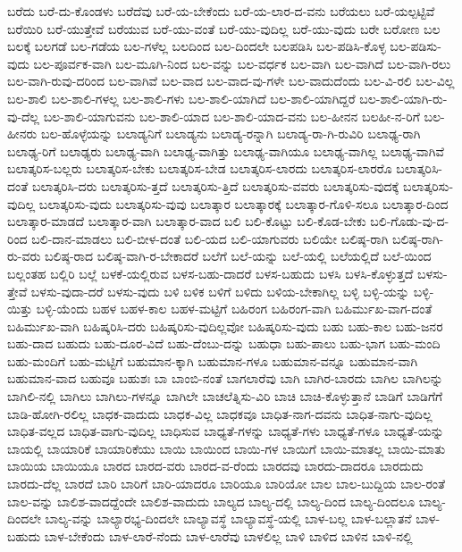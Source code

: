 {ಬರೆದು
ಬರೆ-ದು-ಕೊಂಡಳು
ಬರೆದೆವು
ಬರೆ-ಯ-ಬೇಕೆಂದು
ಬರೆ-ಯ-ಲಾರ-ದ-ವನು
ಬರೆಯಲು
ಬರೆ-ಯಲ್ಪಟ್ಟಿವೆ
ಬರೆಯಿರಿ
ಬರೆ-ಯುತ್ತೇವೆ
ಬರೆಯುವ
ಬರೆ-ಯು-ವಂತೆ
ಬರೆ-ಯು-ವುದಿಲ್ಲ
ಬರೆ-ಯು-ವುದು
ಬರೇ
ಬರೋಣ
ಬಲ
ಬಲಕ್ಕೆ
ಬಲಗಡೆ
ಬಲ-ಗಡೆಯ
ಬಲ-ಗಳೆಲ್ಲ
ಬಲದಿಂದ
ಬಲ-ದಿಂದಲೇ
ಬಲಪಡಿಸಿ
ಬಲ-ಪಡಿಸಿ-ಕೊಳ್ಳ
ಬಲ-ಪಡಿಸು-ವುದು
ಬಲ-ಪೂರ್ವಕ-ವಾಗಿ
ಬಲ-ಮೂಗಿ-ನಿಂದ
ಬಲ-ವನ್ನು
ಬಲ-ವರ್ಧಕ
ಬಲ-ವಾಗಿ
ಬಲ-ವಾಗಿದೆ
ಬಲ-ವಾಗಿ-ರಲು
ಬಲ-ವಾಗಿ-ರುವು-ದರಿಂದ
ಬಲ-ವಾಗಿವೆ
ಬಲ-ವಾದ
ಬಲ-ವಾದ-ವು-ಗಳೇ
ಬಲ-ವಾದುದೆಂದು
ಬಲ-ವಿ-ರಲಿ
ಬಲ-ವಿಲ್ಲ
ಬಲ-ಶಾಲಿ
ಬಲ-ಶಾಲಿ-ಗಳಲ್ಲ
ಬಲ-ಶಾಲಿ-ಗಳು
ಬಲ-ಶಾಲಿ-ಯಾಗಿದೆ
ಬಲ-ಶಾಲಿ-ಯಾಗಿದ್ದರೆ
ಬಲ-ಶಾಲಿ-ಯಾಗಿ-ರು-ವು-ದೆಲ್ಲ
ಬಲ-ಶಾಲಿ-ಯಾಗುವನು
ಬಲ-ಶಾಲಿ-ಯಾದ
ಬಲ-ಶಾಲಿ-ಯಾದ-ವನು
ಬಲ-ಹೀನನ
ಬಲಹೀ-ನ-ರಿಗೆ
ಬಲ-ಹೀನರು
ಬಲ-ಹೊಳ್ಳೆಯನ್ನು
ಬಲಾಡ್ಯನಿಗೆ
ಬಲಾಡ್ಯನು
ಬಲಾಡ್ಯ-ರನ್ನಾಗಿ
ಬಲಾಡ್ಯ-ರಾ-ಗಿ-ರುವಿರಿ
ಬಲಾಢ್ಯ-ರಾಗಿ
ಬಲಾಢ್ಯ-ರಿಗೆ
ಬಲಾಢ್ಯರು
ಬಲಾಢ್ಯ-ವಾಗಿ
ಬಲಾಢ್ಯ-ವಾಗಿತ್ತು
ಬಲಾಢ್ಯ-ವಾಗಿಯೂ
ಬಲಾಢ್ಯ-ವಾಗಿಲ್ಲ
ಬಲಾಢ್ಯ-ವಾಗಿವೆ
ಬಲಾತ್ಕರಿಸ-ಬಲ್ಲರು
ಬಲಾತ್ಕರಿಸ-ಬೇಕು
ಬಲಾತ್ಕರಿಸ-ಬೇಡ
ಬಲಾತ್ಕರಿಸ-ಲಾರದು
ಬಲಾತ್ಕರಿಸ-ಲಾರರೊ
ಬಲಾತ್ಕರಿಸಿ-ದಂತೆ
ಬಲಾತ್ಕರಿಸಿ-ದರು
ಬಲಾತ್ಕರಿಸು-ತ್ತದೆ
ಬಲಾತ್ಕರಿಸು-ತ್ತಿದೆ
ಬಲಾತ್ಕರಿಸು-ವವರು
ಬಲಾತ್ಕರಿಸು-ವುದಕ್ಕೆ
ಬಲಾತ್ಕರಿಸು-ವುದಿಲ್ಲ
ಬಲಾತ್ಕರಿಸು-ವುದು
ಬಲಾತ್ಕರಿಸು-ವುವು
ಬಲಾತ್ಕಾರ
ಬಲಾತ್ಕಾರಕ್ಕೆ
ಬಲಾತ್ಕಾರ-ಗೊಳಿ-ಸಲೂ
ಬಲಾತ್ಕಾರ-ದಿಂದ
ಬಲಾತ್ಕಾರ-ಮಾಡದೆ
ಬಲಾತ್ಕಾರ-ವಾಗಿ
ಬಲಾತ್ಕಾರ-ವಾದ
ಬಲಿ
ಬಲಿ-ಕೊಟ್ಟು
ಬಲಿ-ಕೊಡ-ಬೇಕು
ಬಲಿ-ಗೊಡು-ವು-ದ-ರಿಂದ
ಬಲಿ-ದಾನ-ಮಾಡಲು
ಬಲಿ-ಬೀಳ-ದಂತೆ
ಬಲಿ-ಯದ
ಬಲಿ-ಯಾಗುವರು
ಬಲಿಯೇ
ಬಲಿಷ್ಠ-ರಾಗಿ
ಬಲಿಷ್ಠ-ರಾಗಿ-ರು-ವರು
ಬಲಿಷ್ಠ-ರಾದ
ಬಲಿಷ್ಠ-ವಾಗಿ-ರ-ಬೇಕಾದರೆ
ಬಲೆಗೆ
ಬಲೆ-ಯನ್ನು
ಬಲೆ-ಯಲ್ಲಿ
ಬಲೆಯಲ್ಲಿದೆ
ಬಲೆ-ಯಿಂದ
ಬಲ್ಲಂತಹ
ಬಲ್ಲಿರಿ
ಬಲ್ಲೆ
ಬಳಕೆ-ಯಲ್ಲಿರುವ
ಬಳಸ-ಬಹು-ದಾದರೆ
ಬಳಸ-ಬಹುದು
ಬಳಸಿ
ಬಳಸಿ-ಕೊಳ್ಳುತ್ತದೆ
ಬಳಸು-ತ್ತೇವೆ
ಬಳಸು-ವುದಾ-ದರೆ
ಬಳಸು-ವುದು
ಬಳಿ
ಬಳಿಕ
ಬಳಿಗೆ
ಬಳಿದು
ಬಳಿಯ-ಬೇಕಾಗಿಲ್ಲ
ಬಳ್ಳಿ
ಬಳ್ಳಿ-ಯನ್ನು
ಬಳ್ಳಿ-ಯಿತ್ತು
ಬಳ್ಳಿ-ಯೆಂದು
ಬಹಳ
ಬಹಳ-ಕಾಲ
ಬಹಳ-ಮಟ್ಟಿಗೆ
ಬಹಿರಂಗ
ಬಹಿರಂಗ-ವಾಗಿ
ಬಹಿರ್ಮುಖ-ವಾಗ-ದಂತೆ
ಬಹಿರ್ಮುಖ-ವಾಗಿ
ಬಹಿಷ್ಕರಿಸಿ-ದರು
ಬಹಿಷ್ಕರಿಸು-ವುದಿಲ್ಲವೋ
ಬಹಿಷ್ಕರಿಸು-ವುದು
ಬಹು
ಬಹು-ಕಾಲ
ಬಹು-ಜನರ
ಬಹು-ದಾದ
ಬಹುದು
ಬಹು-ದೂರ-ವಿದೆ
ಬಹು-ದೆಂಬು-ದನ್ನು
ಬಹುಧಾ
ಬಹು-ಪಾಲು
ಬಹು-ಭಾಗ
ಬಹು-ಮಂದಿ
ಬಹು-ಮಂದಿಗೆ
ಬಹು-ಮಟ್ಟಿಗೆ
ಬಹುಮಾನ-ಕ್ಕಾಗಿ
ಬಹುಮಾನ-ಗಳೂ
ಬಹುಮಾನ-ವನ್ನೂ
ಬಹುಮಾನ-ವಾಗಿ
ಬಹುಮಾನ-ವಾದ
ಬಹುವೂ
ಬಹುಶಃ
ಬಾ
ಬಾಂಬಿ-ನಂತೆ
ಬಾಗಲಾರೆವು
ಬಾಗಿ
ಬಾಗಿರ-ಬಾರದು
ಬಾಗಿಲ
ಬಾಗಿಲನ್ನು
ಬಾಗಿಲಿ-ನಲ್ಲಿ
ಬಾಗಿಲು
ಬಾಗಿಲು-ಗಳನ್ನೂ
ಬಾಗಿಲೇ
ಬಾಚಲೆತ್ನಿಸು-ವಿರಿ
ಬಾಚಿ
ಬಾಚಿ-ಕೊಳ್ಳುತ್ತಾನೆ
ಬಾಡಿಗೆ
ಬಾಡಿಗೆಗೆ
ಬಾಡಿ-ಹೋಗಿ-ರಲಿಲ್ಲ
ಬಾಧಕ-ವಾದುದು
ಬಾಧಕ-ವಿಲ್ಲ
ಬಾಧಕವೂ
ಬಾಧಿತ-ನಾಗ-ದವನು
ಬಾಧಿತ-ನಾಗು-ವುದಿಲ್ಲ
ಬಾಧಿತ-ವಲ್ಲದ
ಬಾಧಿತ-ವಾಗು-ವುದಿಲ್ಲ
ಬಾಧಿಸುವ
ಬಾಧ್ಯತೆ-ಗಳನ್ನು
ಬಾಧ್ಯತೆ-ಗಳು
ಬಾಧ್ಯತೆ-ಗಳೂ
ಬಾಧ್ಯತೆ-ಯನ್ನು
ಬಾಯಲ್ಲಿ
ಬಾಯಾರಿಕೆ
ಬಾಯಾರಿಕೆಯು
ಬಾಯಿ
ಬಾಯಿಂದ
ಬಾಯಿ-ಗಳ
ಬಾಯಿಗೆ
ಬಾಯಿ-ಮಾತಲ್ಲ
ಬಾಯಿ-ಮಾತು
ಬಾಯಿಯ
ಬಾಯಿಯೂ
ಬಾರದ
ಬಾರದ-ವರು
ಬಾರದ-ವ-ರೆಂದು
ಬಾರದವು
ಬಾರದು-ದಾದರೂ
ಬಾರದುದು
ಬಾರದು-ದೆಲ್ಲ
ಬಾರದೆ
ಬಾರಿ
ಬಾರಿಗೆ
ಬಾರಿ-ಯಾದರೂ
ಬಾರಿಯೂ
ಬಾರಿಯೋ
ಬಾಲ
ಬಾಲ-ಬುದ್ದಿಯ
ಬಾಲ-ರಂತೆ
ಬಾಲ-ವನ್ನು
ಬಾಲಿಶ-ವಾದದ್ದೆಂದೇ
ಬಾಲಿಶ-ವಾದುದು
ಬಾಲ್ಯದ
ಬಾಲ್ಯ-ದಲ್ಲಿ
ಬಾಲ್ಯ-ದಿಂದ
ಬಾಲ್ಯ-ದಿಂದಲೂ
ಬಾಲ್ಯ-ದಿಂದಲೇ
ಬಾಲ್ಯ-ವನ್ನು
ಬಾಲ್ಯಾರಭ್ಯ-ದಿಂದಲೇ
ಬಾಲ್ಯಾವಸ್ಥೆ
ಬಾಲ್ಯಾವಸ್ಥೆ-ಯಲ್ಲಿ
ಬಾಳ-ಬಲ್ಲ
ಬಾಳ-ಬಲ್ಲಾತನೆ
ಬಾಳ-ಬಹುದು
ಬಾಳ-ಬೇಕೆಂದು
ಬಾಳ-ಲಾರೆ-ನೆಂದು
ಬಾಳ-ಲಾರೆವು
ಬಾಳಲಿಲ್ಲ
ಬಾಳಿ
ಬಾಳಿದ
ಬಾಳಿನ
ಬಾಳಿ-ನಲ್ಲಿ
}
